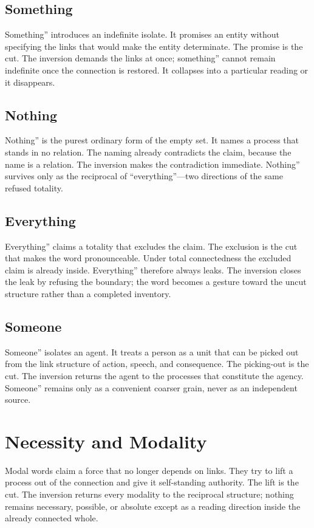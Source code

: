 \documentclass[11pt,a4paper]{article}
\begin{document}
\subsection{Something} Something'' introduces an indefinite isolate. It promises an entity without specifying the links that would make the entity determinate. The promise is the cut. The inversion demands the links at once; something'' cannot remain indefinite once the connection is restored. It collapses into a particular reading or it disappears.

\subsection{Nothing} Nothing'' is the purest ordinary form of the empty set. It names a process that stands in no relation. The naming already contradicts the claim, because the name is a relation. The inversion makes the contradiction immediate. Nothing'' survives only as the reciprocal of ``everything''—two directions of the same refused totality.

\subsection{Everything} Everything'' claims a totality that excludes the claim. The exclusion is the cut that makes the word pronounceable. Under total connectedness the excluded claim is already inside. Everything'' therefore always leaks. The inversion closes the leak by refusing the boundary; the word becomes a gesture toward the uncut structure rather than a completed inventory.

\subsection{Someone} Someone'' isolates an agent. It treats a person as a unit that can be picked out from the link structure of action, speech, and consequence. The picking-out is the cut. The inversion returns the agent to the processes that constitute the agency. Someone'' remains only as a convenient coarser grain, never as an independent source.

\section{Necessity and Modality}

Modal words claim a force that no longer depends on links. They try to lift a process out of the connection and give it self-standing authority. The lift is the cut. The inversion returns every modality to the reciprocal structure; nothing remains necessary, possible, or absolute except as a reading direction inside the already connected whole.
\end{document}
